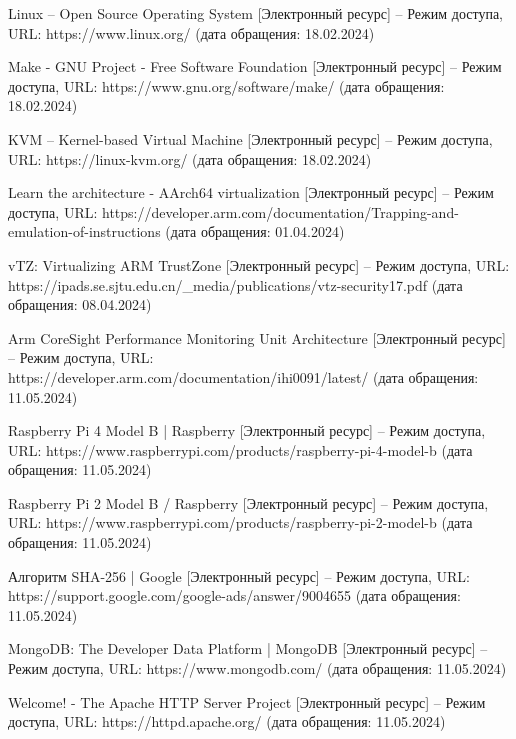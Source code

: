 \begin{thebibliography}{}
Linux -- Open Source Operating System [Электронный ресурс] – Режим доступа, URL: https://www.linux.org/ (дата обращения: 18.02.2024)

Make - GNU Project - Free Software Foundation [Электронный ресурс] – Режим доступа, URL: https://www.gnu.org/software/make/ (дата обращения: 18.02.2024)

KVM -- Kernel-based Virtual Machine [Электронный ресурс] – Режим доступа, URL: https://linux-kvm.org/ (дата обращения: 18.02.2024)

Learn the architecture - AArch64 virtualization [Электронный ресурс] – Режим доступа, URL: https://developer.arm.com/documentation/Trapping-and-emulation-of-instructions (дата обращения: 01.04.2024)

vTZ: Virtualizing ARM TrustZone [Электронный ресурс] – Режим доступа, URL:
https://ipads.se.sjtu.edu.cn/\_media/publications/vtz-security17.pdf (дата обращения: 08.04.2024)

Arm CoreSight Performance Monitoring Unit Architecture [Электронный ресурс] – Режим доступа, URL:
https://developer.arm.com/documentation/ihi0091/latest/ (дата обращения: 11.05.2024)

Raspberry Pi 4 Model B | Raspberry [Электронный ресурс] – Режим доступа, URL:
https://www.raspberrypi.com/products/raspberry-pi-4-model-b (дата обращения: 11.05.2024)

Raspberry Pi 2 Model B / Raspberry [Электронный ресурс] – Режим доступа, URL:
https://www.raspberrypi.com/products/raspberry-pi-2-model-b (дата обращения: 11.05.2024)

Алгоритм SHA-256 | Google [Электронный ресурс] – Режим доступа, URL:
https://support.google.com/google-ads/answer/9004655 (дата обращения: 11.05.2024)

MongoDB: The Developer Data Platform | MongoDB  [Электронный ресурс] – Режим доступа, URL:
https://www.mongodb.com/ (дата обращения: 11.05.2024)

Welcome! - The Apache HTTP Server Project [Электронный ресурс] – Режим доступа, URL:
https://httpd.apache.org/ (дата обращения: 11.05.2024)

\end{thebibliography}
\endgroup

\pagebreak